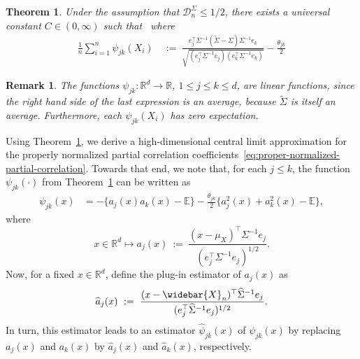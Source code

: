 \documentclass{article}
\newtheorem{theorem}{Theorem}
\newtheorem{remark}{Remark}
\begin{document}
\begin{theorem}\label{thm:linear-expansion-partial-corr}
Under the assumption that $\mathcal{D}_n^{\Sigma} \le 1/2$, there exists a universal constant $C\in(0, \infty)$ such that
\ where
\begin{equation}
\begin{split}
\frac{1}{n}\sum_{i=1}^n \psi_{jk}(X_i) ~&:=~ \frac{e_j^{\top}\Sigma^{-1}(\widetilde{\Sigma} - \Sigma)\Sigma^{-1}e_k}{\sqrt{(e_j^{\top}\Sigma^{-1}e_j)(e_k^{\top}\Sigma^{-1}e_k)}}
- \frac{\theta_{jk}}{2}\left.
\end{split}
\end{equation}
\end{theorem}
\begin{remark}
The functions $\psi_{jk} \colon \mathbb{R}^d \rightarrow \mathbb{R}$, $1 \leq j \leq k \leq d$, are linear functions, since the right hand side of the last expression is an average, because $\widetilde{\Sigma}$ is itself an average.
Furthermore, each
$\psi_{jk}(X_i)$ has zero expectation.
\end{remark}
Using Theorem~\ref{thm:linear-expansion-partial-corr}, we derive a high-dimensional central limit approximation
for the properly normalized partial correlation coefficients~\eqref{eq:proper-normalized-partial-correlation}. Towards that end, we note that, for each $j \leq k$, the function
$\psi_{jk}(\cdot)$ from Theorem~\ref{thm:linear-expansion-partial-corr} can be written as
\begin{equation}\label{eq:def-psi-jk}
\begin{split}
\psi_{jk}(x) &= -\bigg\{a_j(x)a_k(x) - \mathbb{E}\bigg\}
- \frac{\theta_{jk}}{2}\bigg\{a_j^2(x) + a_k^2(x) - \mathbb{E}\bigg\},
\end{split}
\end{equation}
where
\begin{equation}\label{eq:ajx-function}
x \in \mathbb{R}^d \mapsto a_j(x) ~:=~ \frac{(x - \mu_X)^{\top}\Sigma^{-1}e_j}{(e_j^{\top}\Sigma^{-1}e_j)^{1/2}}.
\end{equation}
Now, for a fixed $x \in \mathbb{R}^d$, define the plug-in estimator of $a_j(x)$ as
\begin{equation}\label{eq:ajhatx-function}
\widehat{a}_j(x) ~:=~ \frac{(x - \widebar{X}_n)^{\top}\widehat{\Sigma}^{-1}e_j}{(e_j^{\top}\widehat{\Sigma}^{-1}e_j)^{1/2}}.
\end{equation}
In turn, this estimator leads to an estimator $\widehat{\psi}_{jk}(x)$ of $\psi_{jk}(x)$ by replacing $a_j(x)$ and $a_k(x)$ by $\widehat{a}_j(x)$ and $\widehat{a}_k(x)$, respectively.
\end{document}
